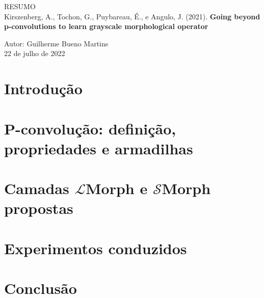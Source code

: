 \documentclass[11pt]{article}
\begin{document}
    \LARGE
    \centering
    RESUMO\\

    \Large
    Kirszenberg, A., Tochon, G., Puybareau, É., e Angulo, J. (2021). \textbf{Going beyond p-convolutions to learn grayscale morphological operator}\\
    \vspace{0.5cm}

    \normalsize
    \centering
    Autor: Guilherme Bueno Martins\\
    22 de julho de 2022\\
    \vspace{1cm}

    \justifying


    \section{Introdução}
    \label{sec:introducao}

    


    \section{P-convolução: definição, propriedades e armadilhas}
    \label{sec:p-convolucao:-definicao-propriedades-e-armadilhas}

    


    \section{Camadas $\mathcal{L}$Morph e $\mathcal{S}$Morph propostas}
    \label{sec:camadas-lmorph-e-smorph-propostas}

    


    \section{Experimentos conduzidos}
    \label{sec:experimentos-conduzidos}

    


    \section{Conclusão}
    \label{sec:conclusao}

    
\end{document}
